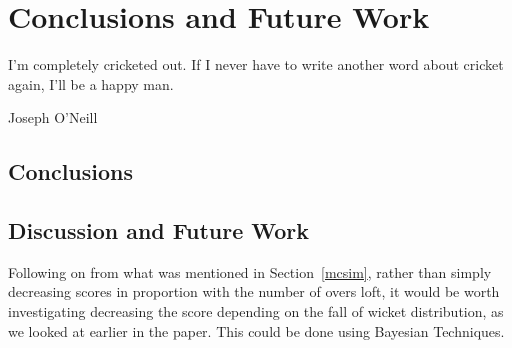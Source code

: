 \chapter{Conclusions and Future Work}

\epigraph{I'm completely cricketed out. If I never have to write another word about cricket again, I'll be a happy man.}{Joseph O'Neill}

\section{Conclusions}




\section{Discussion and Future Work}
Following on from what was mentioned in Section~\ref{mcsim}, rather than simply decreasing scores in proportion with the number of overs loft, 
it would be worth investigating decreasing the score depending on the fall of wicket distribution, as we looked at earlier in the paper. This could be 
done using Bayesian Techniques. 